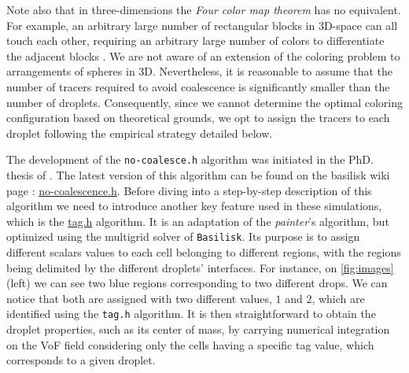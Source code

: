 Note also that in three-dimensions the \textit{Four color map theorem} has no equivalent.
For example, an arbitrary large number of rectangular blocks in 3D-space can all touch each other, requiring an arbitrary large number of colors to differentiate the adjacent blocks \citep{magnant2011coloring}. 
We are not aware of an extension of the coloring problem to arrangements of spheres in 3D. 
Nevertheless, it is reasonable to assume that the number of tracers required to avoid coalescence is significantly smaller than the number of droplets.
Consequently, since we cannot determine the optimal coloring configuration based on theoretical grounds, we opt to assign the tracers to each droplet following the empirical strategy detailed below.

The development of the \texttt{no-coalesce.h} algorithm was initiated in the PhD. thesis of \citet{mani2021numerical}.
The latest version of this algorithm can be found on the basilisk wiki page : \href{http://basilisk.fr/sandbox/fintzin/Rising-Suspenion/no-coalescence.h}{no-coalescence.h}.
Before  diving into a step-by-step description of this algorithm we need to introduce another key feature used in these simulations, which is the \href{http://basilisk.fr/src/tag.h}{tag.h} algorithm. 
It is an adaptation of the \textit{painter}'s algorithm, but optimized using the multigrid solver of \texttt{Basilisk}. 
Its purpose is to assign different scalars values to each cell belonging to different regions, with the regions being delimited by the different droplets' interfaces. 
For instance, on \ref{fig:images} (left) we can see two blue regions corresponding to two different drops.
We can notice that both are assigned with two different values, $1$ and $2$, which are identified using the \texttt{tag.h} algorithm. 
It is then straightforward to obtain the droplet properties, such as its center of mass, by carrying numerical integration on the VoF field considering only the cells having a specific tag value, which corresponds to a given droplet.  


